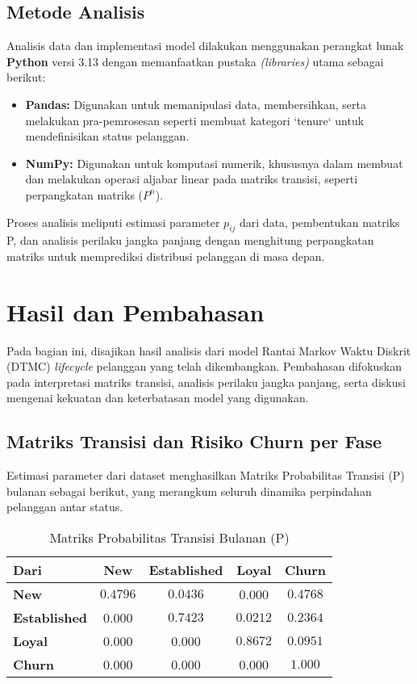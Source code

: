 \documentclass[a4paper,12pt]{article}
\begin{document}
\subsection{Metode Analisis}
Analisis data dan implementasi model dilakukan menggunakan perangkat lunak \textbf{Python} versi 3.13 dengan memanfaatkan pustaka \textit{(libraries)} utama sebagai berikut:
\begin{itemize}
    \item \textbf{Pandas:} Digunakan untuk memanipulasi data, membersihkan, serta melakukan pra-pemrosesan seperti membuat kategori `tenure` untuk mendefinisikan status pelanggan.
    \item \textbf{NumPy:} Digunakan untuk komputasi numerik, khususnya dalam membuat dan melakukan operasi aljabar linear pada matriks transisi, seperti perpangkatan matriks ($P^n$).
\end{itemize}
Proses analisis meliputi estimasi parameter $p_{ij}$ dari data, pembentukan matriks P, dan analisis perilaku jangka panjang dengan menghitung perpangkatan matriks untuk memprediksi distribusi pelanggan di masa depan.

\section{Hasil dan Pembahasan}
Pada bagian ini, disajikan hasil analisis dari model Rantai Markov Waktu Diskrit (DTMC) \textit{lifecycle} pelanggan yang telah dikembangkan. Pembahasan difokuskan pada interpretasi matriks transisi, analisis perilaku jangka panjang, serta diskusi mengenai kekuatan dan keterbatasan model yang digunakan.

\subsection{Matriks Transisi dan Risiko Churn per Fase}
Estimasi parameter dari dataset menghasilkan Matriks Probabilitas Transisi (P) bulanan sebagai berikut, yang merangkum seluruh dinamika perpindahan pelanggan antar status.

\begin{table}[ht]
\centering
\caption{Matriks Probabilitas Transisi Bulanan (P)}
\label{tab:transition_matrix}
\begin{tabular}{l|cccc}
\hline
\textbf{\small{Dari}} & \textbf{New} & \textbf{Established} & \textbf{Loyal} & \textbf{Churn} \\
\hline
\textbf{New} & $0.4796$ & $0.0436$ & 0.000 & $0.4768$ \\
\textbf{Established} & 0.000 & $0.7423$ & $0.0212$ & $0.2364$ \\
\textbf{Loyal} & 0.000 & 0.000 & $0.8672$ & $0.0951$ \\
\textbf{Churn} & 0.000 & 0.000 & 0.000 & $1.000$ \\
\hline
\end{tabular}
\end{table}
\end{document}
